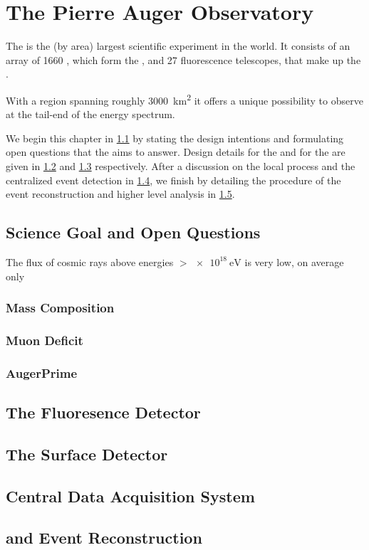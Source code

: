 
\chapter{The Pierre Auger Observatory}
\label{chap:pierre-auger-observatory}

The \PAO is the (by area) largest scientific experiment in the world. It 
consists of an array of 1660 \WCDs, which form the \SD, and 27 fluorescence 
telescopes, that make up the \FD.

With a region spanning roughly \SI{3000}{\kilo\meter\squared} it offers a unique
possibility to observe \UHECRs at the tail-end of the \CR energy spectrum. 

We begin this chapter in \cref{sec:science-case} by stating the design 
intentions and formulating open questions that the \PAO aims to answer. Design
details for the \FD and for the \SD are given in \cref{sec:fd} and \cref{sec:sd} 
respectively. After a discussion on the local \DAQ process and the centralized 
event detection in \cref{sec:cdas}, we finish by detailing the procedure of the
event reconstruction and higher level analysis in \cref{sec:rec}.

\section{Science Goal and Open Questions}
\label{sec:science-case}

The flux of cosmic rays above energies $>\SI{e18}{\eV}$ is very low, on average
only 

\subsection{Mass Composition}
\subsection{Muon Deficit}
\subsection{AugerPrime}

\section{The Fluoresence Detector}
\label{sec:fd}



\section{The Surface Detector}
\label{sec:sd}



\section{Central Data Acquisition System}
\label{sec:cdas}



\section{\Offline and Event Reconstruction}
\label{sec:rec}

